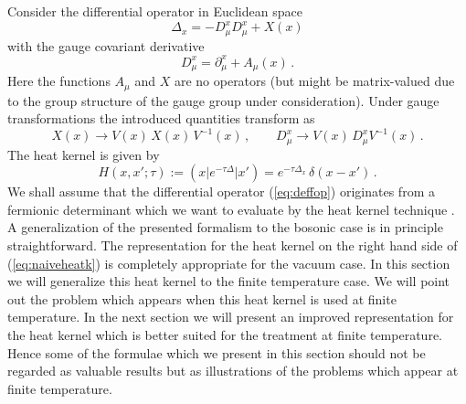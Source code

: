 \documentclass[a4paper,showpacs,showkeys,prd,nofootinbib]{revtex4}
\begin{document}
Consider the differential operator in Euclidean space
\begin{equation}
  \label{eq:deffop}
\Delta_x = -D^x_\mu D^x_\mu +X(x)
\end{equation}
with the gauge covariant derivative
\begin{equation}
  \label{eq:gaugeder}
D^x_\mu = \partial^x_\mu + A_\mu(x)  \,.
\end{equation}
Here the functions $A_\mu$ and $X$ are no operators (but might be matrix-valued due to 
the group structure of the gauge group under consideration). 
Under gauge transformations the introduced quantities transform as
\begin{equation}
  \label{eq:gaugetrafo}
X(x) \to V(x)\, X(x) \, V^{-1}(x) \,, \qquad D^x_\mu \to V(x)\, D^x_\mu V^{-1}(x) \,.
\end{equation}
The heat kernel is given by
\begin{equation}
  \label{eq:naiveheatk}
H(x,x';\tau) := \left( x \vert e^{-\tau \Delta} \vert x' \right) 
= e^{-\tau \Delta_x} \, \delta(x-x')  \,.
\end{equation}
We shall assume that the differential operator (\ref{eq:deffop}) originates from
a fermionic determinant which we want to evaluate by the heat kernel technique 
\cite{Ball:1989xg}. A generalization of the presented formalism to the bosonic case
is in principle straightforward.
The representation for the heat kernel on the right hand side of (\ref{eq:naiveheatk})
is completely appropriate for the vacuum case.
In this section we will generalize this heat kernel to the finite temperature case.
We will point out the problem which appears when this heat kernel is used at finite
temperature. In the next section we will present an improved representation for
the heat kernel which is better suited for the treatment at finite temperature.
Hence some of the formulae which we present in this section should not be regarded as
valuable results but as illustrations of the problems which appear at finite temperature.
\end{document}
